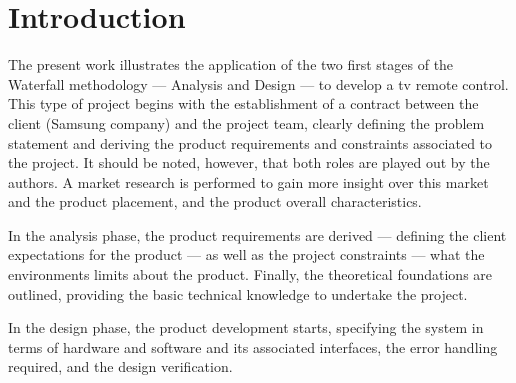 %
%
%
\chapter{Introduction}%
\label{ch:introduction}
The present work illustrates the application of the two first stages of the Waterfall methodology
--- Analysis and Design --- to develop a \gls{tv} remote control. This type of project
begins with the establishment of a contract between the client (Samsung company)
and the project team, clearly defining the problem statement and deriving the
product requirements and constraints associated to the project. It should be
noted, however, that both roles are played out by the authors.
A market
research is performed to gain more insight over this market and the
product placement, and the product overall characteristics.

In the analysis
phase, the product requirements are derived --- defining the client expectations
for the product --- as well as the project constraints --- what the environments
limits about the product. Finally, the theoretical foundations are outlined,
providing the basic technical knowledge to undertake the project.

In the design phase, the product development starts, specifying the system in
terms of hardware and software and its associated interfaces, the error handling
required, and the design verification.
%





%
